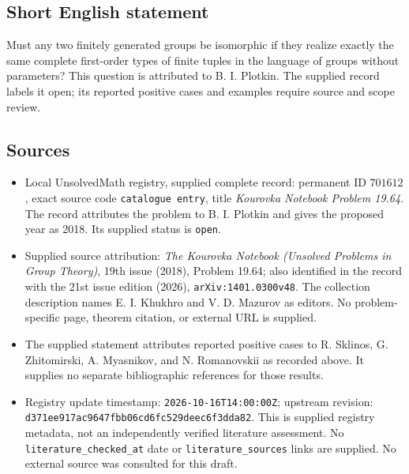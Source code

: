 \documentclass[11pt]{article}
\begin{document}
\subsection{Short English statement}
Must any two finitely generated groups be isomorphic if they realize exactly the same complete first-order types of finite tuples in the language of groups without parameters? This question is attributed to B. I. Plotkin. The supplied record labels it open; its reported positive cases and examples require source and scope review.
\subsection{Sources}
\begin{itemize}
\item Local UnsolvedMath registry, supplied complete record: permanent ID \(701612\), exact source code \texttt{catalogue entry}, title \emph{Kourovka Notebook Problem 19.64}. The record attributes the problem to B. I. Plotkin and gives the proposed year as 2018. Its supplied status is \texttt{open}.
\item Supplied source attribution: \emph{The Kourovka Notebook (Unsolved Problems in Group Theory)}, 19th issue (2018), Problem 19.64; also identified in the record with the 21st issue edition (2026), \texttt{arXiv:1401.0300v48}. The collection description names E. I. Khukhro and V. D. Mazurov as editors. No problem-specific page, theorem citation, or external URL is supplied.
\item The supplied statement attributes reported positive cases to R. Sklinos, G. Zhitomirski, A. Myasnikov, and N. Romanovskii as recorded above. It supplies no separate bibliographic references for those results.
\item Registry update timestamp: \texttt{2026-10-16T14:00:00Z}; upstream revision: \texttt{d371ee917ac9647fbb06cd6fc529deec6f3dda82}. This is supplied registry metadata, not an independently verified literature assessment. No \texttt{literature\_checked\_at} date or \texttt{literature\_sources} links are supplied. No external source was consulted for this draft.
\end{itemize}
\end{document}
